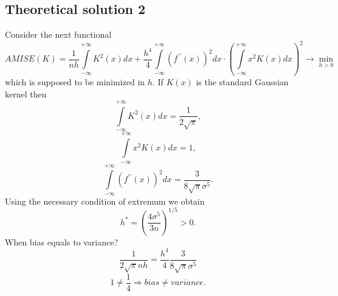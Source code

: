 \documentclass[a4paper, 12pt]{article}
\begin{document}
\subsection{Theoretical solution 2}
Consider the next functional
$$
AMISE(K) = \dfrac{1}{nh} \int \limits_{-\infty}^{+\infty} K^2(x) dx + \dfrac{h^4}{4} \int \limits_{-\infty}^{+\infty} (f^{\prime \prime}(x))^2 dx \cdot \left(\int \limits_{-\infty}^{+\infty} x^2 K(x) dx \right)^2 \rightarrow \min \limits_{h > 0}
$$  
which is supposed to be minimized in $h.$ If $K(x)$ is the standard Gaussian kernel then 
$$
\int \limits_{-\infty}^{+\infty} K^2(x) dx = \dfrac{1}{2\sqrt{\pi}},
$$
$$
\int \limits_{-\infty}^{+\infty} x^2 K(x) dx = 1,
$$
$$
 \int \limits_{-\infty}^{+\infty} (f^{\prime \prime}(x))^2 dx = \dfrac{3}{8 \sqrt{\pi} \sigma^5}.
$$
Using the necessary condition of extremum we obtain
$$
h^* = \left( \dfrac{4 \sigma^5}{3n} \right)^{1/5}> 0.
$$
When bias equals to variance?
$$
\dfrac{1}{2\sqrt{\pi}nh} = \dfrac{h^4}{4} \dfrac{3}{8 \sqrt{\pi} \sigma^5} 
$$
$$
1 \neq \dfrac{1}{4} \Rightarrow bias \neq variance.
$$
\end{document}
